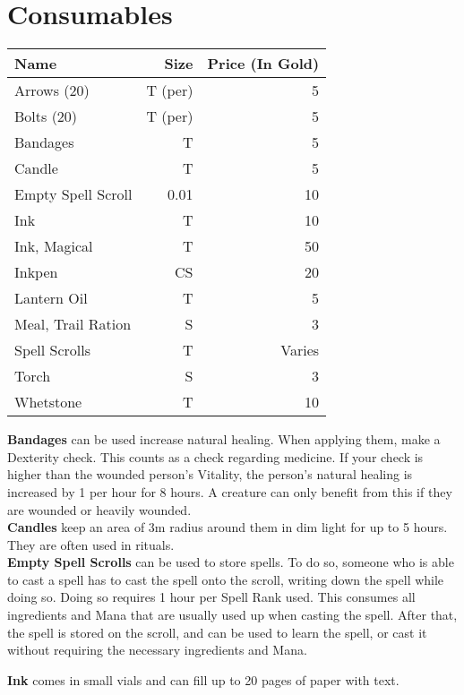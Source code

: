 \section{Consumables}\label{sec:consumables}
\begin{longtable}{l | r | r}
	Name & Size & Price (In Gold)\\ \hline
	Arrows (20) & T (per) & 5\\
	Bolts (20) & T (per) & 5\\
	Bandages & T & 5\\
	Candle & T & 5\\
	Empty Spell Scroll & 0.01 & 10\\
	Ink & T & 10\\
	Ink, Magical & T & 50\\
	Inkpen & CS & 20\\
	Lantern Oil & T & 5\\
	Meal, Trail Ration & S & 3\\
	Spell Scrolls & T & Varies\\
	Torch & S & 3\\
	Whetstone & T & 10\\
\end{longtable}


\textbf{Bandages} can be used increase natural healing.
When applying them, make a Dexterity check.
This counts as a check regarding medicine.
If your check is higher than the wounded person's Vitality, the person's natural healing is increased by 1 per hour for 8 hours.
A creature can only benefit from this if they are wounded or heavily wounded.\\

\textbf{Candles} keep an area of 3m radius around them in dim light for up to 5 hours.
They are often used in rituals.\\

\textbf{Empty Spell Scrolls} can be used to store spells.
To do so, someone who is able to cast a spell has to cast the spell onto the scroll, writing down the spell while doing so.
Doing so requires 1 hour per Spell Rank used.
This consumes all ingredients and Mana that are usually used up when casting the spell.
After that, the spell is stored on the scroll, and can be used to learn the spell, or cast it without requiring the necessary ingredients and Mana.

\textbf{Ink} comes in small vials and can fill up to 20 pages of paper with text.\\

